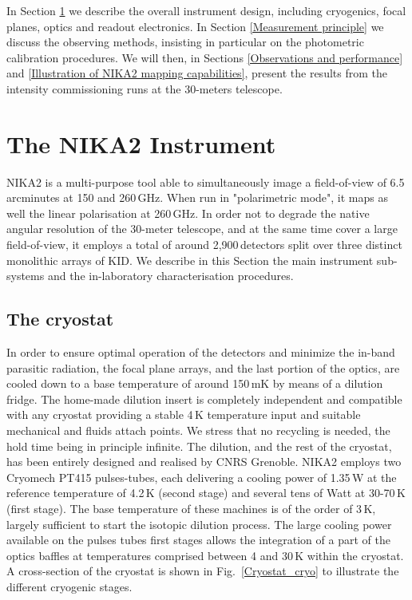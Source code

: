 \documentclass[]{aa} %
\begin{document}
In Section \ref{The NIKA2 Instrument} we describe the overall instrument design, including cryogenics, focal planes, optics and readout electronics. In Section \ref{Measurement principle} we discuss the observing methods, insisting in particular on the photometric calibration procedures. We will then, in Sections \ref{Observations and performance} and \ref{Illustration of NIKA2 mapping capabilities}, present the results from the intensity commissioning runs at the 30-meters telescope. 


\section{The NIKA2 Instrument}
\label{The NIKA2 Instrument}

NIKA2 is a multi-purpose tool able to simultaneously image a field-of-view of 6.5\,arcminutes at 150 and 260\,GHz. When run in "polarimetric mode", it maps as well the linear polarisation  at 260\,GHz. In order not to degrade the native angular resolution of the 30-meter telescope, and at the same time cover a large field-of-view, it employs a total of around 2,900\,detectors split over three distinct monolithic arrays of KID. We describe in this Section the main instrument sub-systems and the in-laboratory characterisation procedures.

 \subsection{The cryostat}

In order to ensure optimal operation of the detectors and minimize the in-band parasitic radiation, the focal plane arrays, and the last portion of the optics, are cooled down to a base temperature of around 150\,mK by means of a dilution fridge. The home-made dilution insert is completely independent and compatible with any cryostat providing a stable 4\,K temperature input and suitable mechanical and fluids attach points. We stress that no recycling is needed, the hold time being in principle infinite. The dilution, and the rest of the cryostat, has been entirely designed and realised by CNRS Grenoble. NIKA2 employs two Cryomech PT415 pulses-tubes, each delivering a cooling power of 1.35\,W at the reference temperature of 4.2\,K (second stage) and several tens of Watt at 30-70\,K (first stage). The base temperature of these machines is of the order of 3\,K, largely sufficient to start the isotopic dilution process. The large cooling power available on the pulses tubes first stages allows the integration of a part of the optics baffles at temperatures comprised between 4 and 30\,K within the cryostat. A cross-section of the cryostat is shown in Fig.~\ref{Cryostat_cryo} to illustrate the different cryogenic stages.
\end{document}
